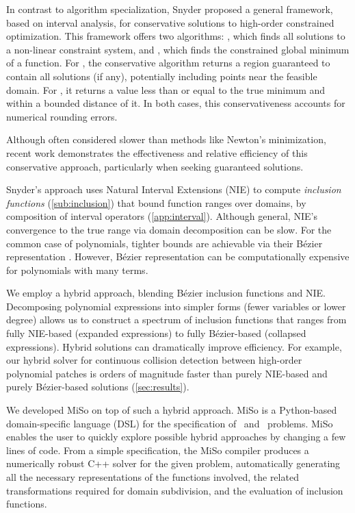 In contrast to algorithm specialization, Snyder \cite{snyder92} proposed a general framework, based on interval analysis, for conservative solutions to high-order constrained optimization. This framework offers two algorithms: \solve, which finds all solutions to a non-linear constraint system, and \minimize, which finds the constrained global minimum of a function. For \solve, the conservative algorithm returns a region guaranteed to contain all solutions (if any), potentially including points near the feasible domain. For \minimize, it returns a value less than or equal to the true minimum and within a bounded distance of it. In both cases, this conservativeness accounts for numerical rounding errors.

Although often considered slower than methods like Newton's minimization, recent work \cite{Wang2021,Chen2024} 
 demonstrates the effectiveness and relative efficiency of this conservative approach, particularly when seeking guaranteed solutions. 

Snyder's approach uses Natural Interval Extensions (NIE) to compute \emph{inclusion functions} (\cref{sub:inclusion}) that bound function ranges over domains, by composition of interval operators (\cref{app:interval}). Although general, NIE's convergence to the true range via domain decomposition can be slow. 
For the common case of polynomials, tighter bounds are achievable via their Bézier representation \cite{Lengagne:2020,stahl_interval_1995,johnen2013}. 
However, Bézier representation can be computationally expensive for polynomials with many terms. 

We employ a hybrid approach, blending Bézier inclusion functions and NIE. Decomposing polynomial expressions into simpler forms (fewer variables or lower degree) allows us to construct a spectrum of inclusion functions that ranges from fully NIE-based (expanded expressions) to fully Bézier-based (collapsed expressions).
Hybrid solutions can dramatically improve efficiency. For example, our hybrid solver for continuous collision detection between high-order polynomial patches is orders of magnitude faster than purely NIE-based and purely Bézier-based solutions (\cref{sec:results}).

We developed MiSo on top of such a hybrid approach. MiSo is a Python-based domain-specific language (DSL) for the specification of \solve\ and \minimize\ problems. MiSo enables the user to quickly explore possible hybrid approaches by changing a few lines of code.
From a simple specification, the MiSo compiler produces a numerically robust C++ solver for the given problem, automatically generating all the necessary representations of the functions involved, the related transformations required for domain subdivision, and the evaluation of inclusion functions.

